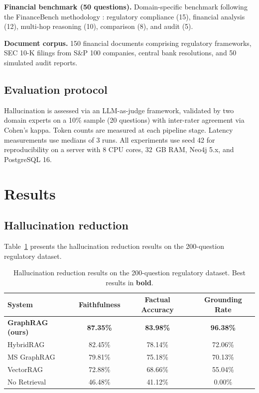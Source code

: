 \documentclass[review]{elsarticle}
\begin{document}
\textbf{Financial benchmark (50 questions).} Domain-specific benchmark following the FinanceBench methodology \citep{islam2023financebench}: regulatory compliance (15), financial analysis (12), multi-hop reasoning (10), comparison (8), and audit (5).

\textbf{Document corpus.} 150 financial documents comprising regulatory frameworks, SEC 10-K filings from S\&P 100 companies, central bank resolutions, and 50 simulated audit reports.

\subsection{Evaluation protocol}

Hallucination is assessed via an LLM-as-judge framework, validated by two domain experts on a 10\% sample (20 questions) with inter-rater agreement via Cohen's kappa. Token counts are measured at each pipeline stage. Latency measurements use medians of 3 runs. All experiments use seed 42 for reproducibility on a server with 8 CPU cores, 32~GB RAM, Neo4j 5.x, and PostgreSQL 16.


\section{Results}
\label{sec:results}

\subsection{Hallucination reduction}
\label{sec:res-hallucination}

Table~\ref{tab:hallucination} presents the hallucination reduction results on the 200-question regulatory dataset.

\begin{table}[t]
\caption{Hallucination reduction results on the 200-question regulatory dataset. Best results in \textbf{bold}.}
\label{tab:hallucination}
\centering
\begin{tabular}{@{}lccc@{}}
\toprule
\textbf{System} & \textbf{Faithfulness} & \textbf{Factual Accuracy} & \textbf{Grounding Rate} \\
\midrule
\textbf{GraphRAG (ours)} & \textbf{87.35\%} & \textbf{83.98\%} & \textbf{96.38\%} \\
HybridRAG & 82.45\% & 78.14\% & 72.06\% \\
MS GraphRAG & 79.81\% & 75.18\% & 70.13\% \\
VectorRAG & 72.88\% & 68.66\% & 55.04\% \\
No Retrieval & 46.48\% & 41.12\% & 0.00\% \\
\bottomrule
\end{tabular}
\end{table}
\end{document}
